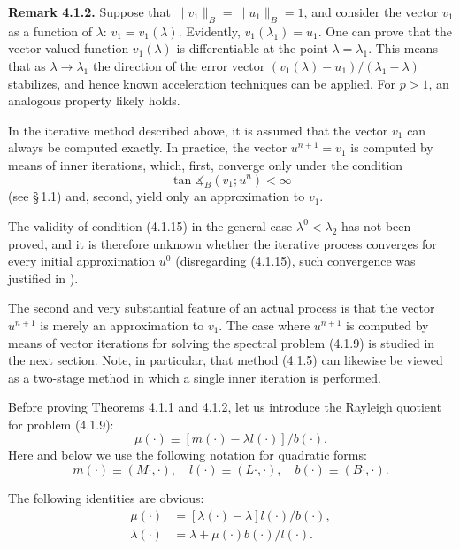 \documentclass[11pt,oneside]{book}
\newcommand{\ang}{\measuredangle}
\begin{document}
\textbf{Remark 4.1.2.} Suppose that $\|v_1\|_B = \|u_1\|_B = 1$, and consider the vector $v_1$ as a function of $\lambda$: $v_1 = v_1(\lambda)$. Evidently, $v_1(\lambda_1) = u_1$. One can prove that the vector-valued function $v_1(\lambda)$ is differentiable at the point $\lambda = \lambda_1$. This means that as $\lambda \to \lambda_1$ the direction of the error vector $(v_1(\lambda) - u_1) / (\lambda_1 - \lambda)$ stabilizes, and hence known acceleration techniques can be applied. For $p > 1$, an analogous property likely holds.

In the iterative method described above, it is assumed that the vector $v_1$ can always be computed exactly. In practice, the vector $u^{n+1} = v_1$ is computed by means of inner iterations, which, first, converge only under the condition
\[
\tan \ang_B (v_1; u^n) < \infty \tag{4.1.15}
\]
(see \S\,1.1) and, second, yield only an approximation to $v_1$.

The validity of condition (4.1.15) in the general case $\lambda^0 < \lambda_2$ has not been proved, and it is therefore unknown whether the iterative process converges for every initial approximation $u^0$ (disregarding (4.1.15), such convergence was justified in \citep{Scott1981,GavrilinIlin1981,Ilin1985}).

The second and very substantial feature of an actual process is that the vector $u^{n+1}$ is merely an approximation to $v_1$. The case where $u^{n+1}$ is computed by means of vector iterations for solving the spectral problem (4.1.9) is studied in the next section. Note, in particular, that method (4.1.5) can likewise be viewed as a two-stage method in which a single inner iteration is performed.

Before proving Theorems 4.1.1 and 4.1.2, let us introduce the Rayleigh quotient for problem (4.1.9):
\[
\mu(\cdot) \equiv [ m(\cdot) - \lambda l(\cdot) ] / b(\cdot).
\]
Here and below we use the following notation for quadratic forms:
\[
m(\cdot) \equiv (M\cdot, \cdot), \quad l(\cdot) \equiv (L\cdot, \cdot), \quad b(\cdot) \equiv (B\cdot, \cdot).
\]

The following identities are obvious:
\[
\begin{aligned}
\mu(\cdot) &= [ \lambda(\cdot) - \lambda ] l(\cdot) / b(\cdot), \\
\lambda(\cdot) &= \lambda + \mu(\cdot) b(\cdot) / l(\cdot).
\end{aligned}
\tag{4.1.16}
\]
\end{document}
